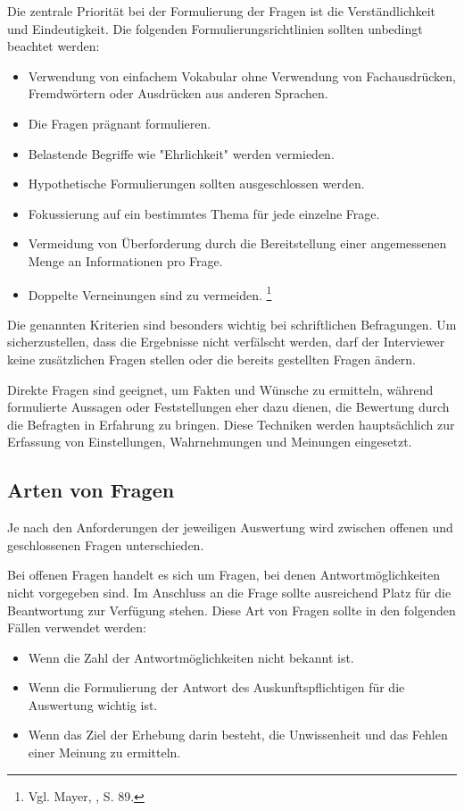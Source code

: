 Die zentrale Priorität bei der Formulierung der Fragen ist die Verständlichkeit und Eindeutigkeit. Die folgenden
Formulierungsrichtlinien sollten unbedingt beachtet werden:
\begin{itemize}
    \item Verwendung von einfachem Vokabular ohne Verwendung von Fachausdrücken, Fremdwörtern oder Ausdrücken aus anderen Sprachen.
    \item Die Fragen prägnant formulieren.
    \item Belastende Begriffe wie "Ehrlichkeit" werden vermieden.
    \item Hypothetische Formulierungen sollten ausgeschlossen werden.
    \item Fokussierung auf ein bestimmtes Thema für jede einzelne Frage.
    \item Vermeidung von Überforderung durch die Bereitstellung einer angemessenen Menge an Informationen pro Frage.
    \item Doppelte Verneinungen sind zu vermeiden. \footnote{Vgl. Mayer, \cite{Interview und schriftliche Befragung}, S. 89.}\\
\end{itemize}

Die genannten Kriterien sind besonders wichtig bei schriftlichen Befragungen. Um sicherzustellen, dass die Ergebnisse
nicht verfälscht werden, darf der Interviewer keine zusätzlichen Fragen stellen oder die bereits gestellten Fragen ändern.

Direkte Fragen sind geeignet, um Fakten und Wünsche zu ermitteln, während formulierte Aussagen oder Feststellungen eher
dazu dienen, die Bewertung durch die Befragten in Erfahrung zu bringen. Diese Techniken werden hauptsächlich zur
Erfassung von Einstellungen, Wahrnehmungen und Meinungen eingesetzt.

\subsection{Arten von Fragen}
Je nach den Anforderungen der jeweiligen Auswertung wird zwischen offenen und geschlossenen Fragen unterschieden.

Bei offenen Fragen handelt es sich um Fragen, bei denen Antwortmöglichkeiten nicht vorgegeben sind. Im Anschluss an die
Frage sollte ausreichend Platz für die Beantwortung zur Verfügung stehen. Diese Art von Fragen sollte in den folgenden
Fällen verwendet werden:
\begin{itemize}
    \item Wenn die Zahl der Antwortmöglichkeiten nicht bekannt ist.
    \item Wenn die Formulierung der Antwort des Auskunftspflichtigen für die Auswertung wichtig ist.
    \item Wenn das Ziel der Erhebung darin besteht, die Unwissenheit und das Fehlen einer Meinung zu ermitteln.\\
\end{itemize}

